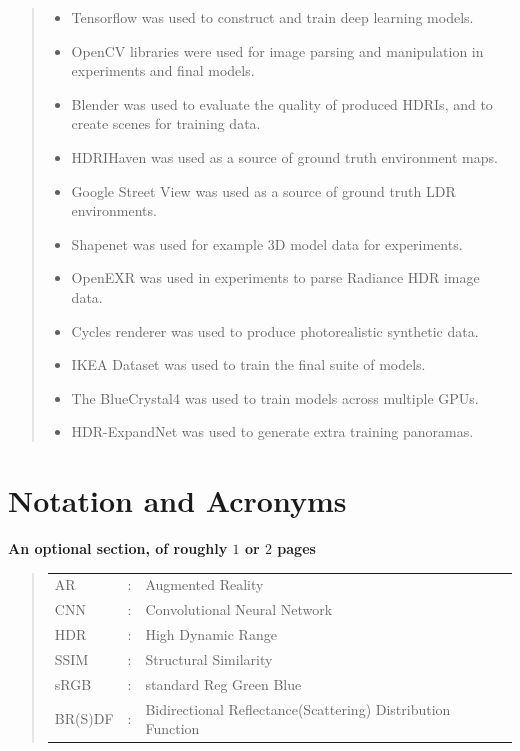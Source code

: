 \documentclass[ %
                    author={Gavin Parker},
                supervisor={Dr. Neill Campbell},
                    degree={MEng},
                     title={Deep Siamese Networks for Illumination Estimation from Stereo Images},
                  subtitle={},
                      type={research},
                      year={2018} ]{dissertation}
\begin{document}
\vspace{1cm} 
\begin{quote}
\noindent
\begin{itemize}
\item Tensorflow was used to construct and train deep learning models.
\item OpenCV libraries were used for image parsing and manipulation in experiments and final models.
\item Blender was used to evaluate the quality of produced HDRIs, and to create scenes for training data.
\item HDRIHaven was used as a source of ground truth environment maps.
\item Google Street View was used as a source of ground truth LDR environments.
\item Shapenet was used for example 3D model data for experiments.
\item OpenEXR was used in experiments to parse Radiance HDR image data.
\item Cycles renderer was used to produce photorealistic synthetic data.
\item IKEA Dataset was used to train the final suite of models.
\item The BlueCrystal4 was used to train models across multiple GPUs.
\item HDR-ExpandNet was used to generate extra training panoramas.
\end{itemize}
\end{quote}


\chapter*{Notation and Acronyms}

{\bf An optional section, of roughly $1$ or $2$ pages}
\vspace{1cm} 


\begin{quote}
\noindent
\begin{tabular}{lcl}
AR                 &:     & Augmented Reality                                         	\\
CNN                 &:     & Convolutional Neural Network                             	\\
HDR					&:		& High Dynamic Range										\\
SSIM				&:		& Structural Similarity										\\
sRGB				&:		& standard Reg Green Blue									\\
BR(S)DF				&:		& Bidirectional Reflectance(Scattering) Distribution Function
\end{tabular}
\end{quote}
\end{document}
